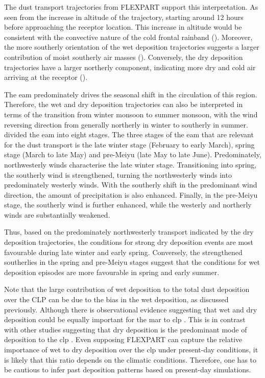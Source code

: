 The dust transport trajectories from FLEXPART support this interpretation.
As seen from the increase in altitude of the trajectory, starting around 12 hours before approaching the receptor location. This increase in altitude would be consistent with the convective nature of the cold frontal rainband (). 
Moreover, the more southerly orientation of the wet deposition trajectories suggests a larger contribution of moist southerly air masses (). 
Conversely, the dry deposition trajectories have a larger northerly component, indicating more dry and cold air arriving at the receptor (). 

The \acrfull{eam} predominately drives the seasonal shift in the circulation of this region. 
Therefore, the wet and dry deposition trajectories can also be interpreted in terms of the transition from winter monsoon to summer monsoon, with the wind reversing direction from generally northerly in winter to southerly in summer. \textcite{dai2021define} divided the \acrshort{eam} into eight stages. 
The three stages of the \acrshort{eam} that are relevant for the dust transport is the late winter stage (February to early March), spring stage (March to late May) and pre-Meiyu (late May to late June). 
Predominately, northwesterly winds characterise the late winter stage. 
Transitioning into spring, the southerly wind is strengthened, turning the northwesterly  winds into  predominately westerly winds. 
With the southerly shift in the predominant wind direction, the amount of precipitation is also enhanced. 
Finally, in the pre-Meiyu stage, the southerly wind is further enhanced, while the westerly and northerly winds are substantially weakened. 


Thus, based on the predominately northwesterly transport indicated by the dry deposition trajectories, the conditions for strong dry deposition events are most favourable during late winter and early spring.
Conversely, the strengthened southerlies in the spring and pre-Meiyu stages suggest that the conditions for wet deposition episodes are more favourable in spring and early summer. 

Note that the large contribution of wet deposition to the total dust deposition over the CLP can be due to the bias in the wet deposition, as discussed previously. Although there is observational evidence suggesting that wet and dry deposition could be equally important for the \acrshort{mar} to \acrshort{clp} \parencite{wang2015geochemical}. This is in contrast with other studies suggesting that dry deposition is the predominant mode of deposition to the \acrshort{clp} \parencite{zhang1993atmospheric, shi2011distinguishing}.
Even supposing FLEXPART can capture the relative importance of wet to dry deposition over the \acrshort{clp} under present-day conditions, it is likely that this ratio depends on the climatic conditions. Therefore, one has to be cautious to infer past deposition patterns based on present-day simulations.  

